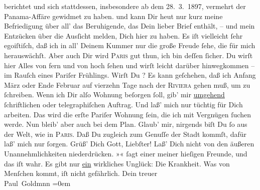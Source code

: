 \begin{ledgroupsized}[t]{13cm}
{{{                  berichtet und sich stattdessen, insbesondere ab dem 28. 3. 1897, vermehrt der Panama-Affäre gewidmet zu haben.}}}\label{K_L02803-1h} und kann Dir heut nur kurz meine Befriedigung über all’ das Beruhigende, das Dein
               lieber Brief enthält, – und mein Entzücken über die Ausſicht melden, Dich hier zu
               haben. Es iſt vielleicht ſehr egoiſtiſch, daß ich in all’ Deinem Kummer nur die große
               Freude ſehe, die für mich herauswächſt. Aber auch Dir wird \textsc{Paris} gut thun, ich bin deſſen ſicher. {\pb}Du wirſt
               hier Alles von fern und von hoch ſehen und wirſt leicht darüber hinwegkommen – im
               Rauſch eines Pariſer Frühlings.\pend
           \pstart
           Wirſt Du \label{K_L02803-2v}\label{K_L02803-2h}? Es kann geſchehen, daß ich
               Anfang März oder Ende Februar
               auf vierzehn Tage nach der \textsc{Riviera} gehen muß, um \label{K_L02803-3v}\label{K_L02803-3h} zu ſchreiben. Wenn ich Dir alſo Wohnung beſorgen ſoll, gib’ mir \uline{umgehend} ſchriftlichen oder telegraphiſchen Auftrag.
               Und laß’ mich nur tüchtig für Dich arbeiten. {\pb}Das
               wird die erſte Pariſer Wohnung ſein, die ich mit
               Vergnügen ſuchen werde.\pend
           \pstart
           Nun bleib’ aber auch bei dem Plan. Glaub’ mir, nirgends biſt Du ſo aus der Welt, wie
               in \textsc{Paris}. Daß Du zugleich zum Genuſſe der Stadt kommſt, dafür laß’ mich nur  ſorgen.\pend
           \pstart
           Grüß’ Dich Gott, Liebſter! Laß’ Dich nicht von den äußeren Unannehmlichkeiten
               niederdrücken. »\label{K_L02803-5v}\label{K_L02803-5h}« ſagt einer meiner hieſigen Freunde, und das iſt wahr. {\pb}Es gibt nur \uline{ein}
               wirkliches Unglück: Die Krankheit. Was von Menſchen kommt, iſt nicht gefährlich.\pend
           \pstart
           Dein treuer {\\[\baselineskip]}\spacefill\mbox{Paul Goldmnn}\pend
           \leftskip=0em{}
         
         \endnumbering{}\end{ledgroupsized}  \newcommand{\dateiname}{L02803}\newcommand{\titel}{Paul Goldmann an Arthur Schnitzler, 16. 2. [1897]}\newcommand{\editorInnen}{Martin Anton Müller und Laura Untner}
      